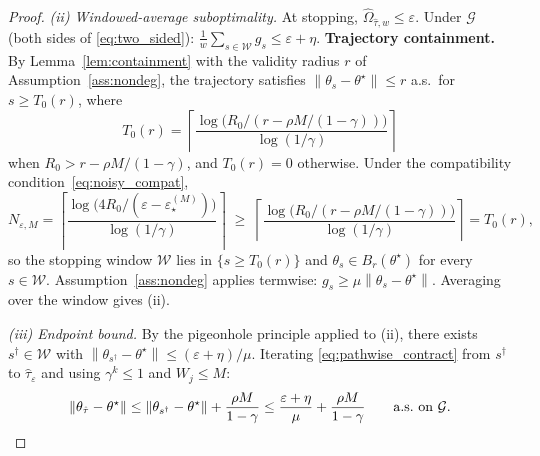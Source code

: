\documentclass[12pt,a4paper]{article}
\newcommand{\norm}[1]{\left\lVert#1\right\rVert}
\newcommand{\Ogap}{\Omega}
\begin{document}
\begin{proof}
\emph{(ii) Windowed-average suboptimality.}
At stopping, $\widehat{\Ogap}_{\hat\tau, w} \leq \varepsilon$. Under $\mathcal{G}$
(both sides of \eqref{eq:two_sided}):
$\frac{1}{w}\sum_{s \in \mathcal{W}} g_s \leq \varepsilon + \eta$.
\textbf{Trajectory containment.}
By Lemma~\ref{lem:containment} with the validity radius $r$ of
Assumption~\ref{ass:nondeg}, the trajectory satisfies $\norm{\theta_s -
\theta^\star} \leq r$ a.s.\ for $s \geq T_0(r)$, where
\[
  T_0(r) =
  \left\lceil
  \frac{\log\bigl(R_0/(r - \rho M/(1-\gamma))\bigr)}{\log(1/\gamma)}
  \right\rceil
\]
when $R_0 > r - \rho M/(1-\gamma)$, and $T_0(r) = 0$ otherwise. Under the
compatibility condition~\eqref{eq:noisy_compat},
\[
  N_{\varepsilon, M}
  = \left\lceil
    \frac{\log\!\bigl(4R_0/(\varepsilon - \varepsilon_\star^{(M)})\bigr)}
         {\log(1/\gamma)}
    \right\rceil
  \;\geq\;
  \left\lceil
    \frac{\log\bigl(R_0/(r - \rho M/(1-\gamma))\bigr)}{\log(1/\gamma)}
  \right\rceil
  = T_0(r),
\]
so the stopping window $\mathcal{W}$ lies in $\{s \geq T_0(r)\}$ and
$\theta_s \in B_r(\theta^\star)$ for every $s \in \mathcal{W}$.
Assumption~\ref{ass:nondeg} applies termwise:
$g_s \geq \mu\norm{\theta_s - \theta^\star}$. Averaging over the window
gives (ii).

\emph{(iii) Endpoint bound.}
By the pigeonhole principle applied to (ii), there exists
$s^\dagger \in \mathcal{W}$ with
$\norm{\theta_{s^\dagger} - \theta^\star} \leq (\varepsilon + \eta)/\mu$.
Iterating \eqref{eq:pathwise_contract} from $s^\dagger$ to $\hat\tau_\varepsilon$
and using $\gamma^k \leq 1$ and $W_j \leq M$:
\[
  \norm{\theta_{\hat\tau} - \theta^\star}
  \leq \norm{\theta_{s^\dagger} - \theta^\star} + \frac{\rho M}{1 - \gamma}
  \leq \frac{\varepsilon + \eta}{\mu} + \frac{\rho M}{1 - \gamma}
  \qquad \text{a.s.\ on } \mathcal{G}. \qedhere
\]
\end{proof}
\end{document}
